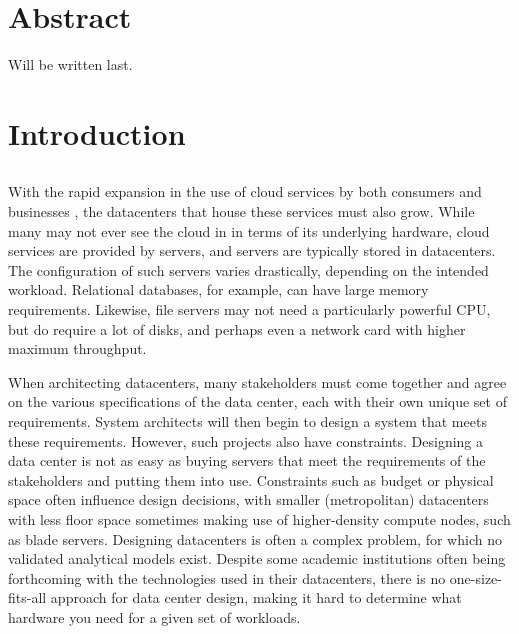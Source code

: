 \documentclass[11pt]{article}
\begin{document}
\newpage

\tableofcontents
\newpage
\listoffigures
\listoftables
\newpage


\section*{Abstract}
Will be written last.
\newpage

\section{Introduction} \label{sec:introduction}
	
	\subsection{\opendc{}}
		With the rapid expansion in the use of cloud services by both consumers and businesses \cite{Kushida2015}\cite{mokhtar2013}, the datacenters that house these services must also grow. 
		While many may not ever see the cloud in in terms of its underlying hardware, cloud services are provided by servers, and servers are typically stored in datacenters. 
		The configuration of such servers varies drastically, depending on the intended workload. 
		Relational databases, for example, can have large memory requirements. 
		Likewise, file servers may not need a particularly powerful CPU, but do require a lot of disks, and perhaps even a network card with higher maximum throughput.

		When architecting datacenters, many stakeholders must come together and agree on the various specifications of the data center, each with their own unique set of requirements. 
		System architects will then begin to design a system that meets these requirements. 
		However, such projects also have constraints. 
		Designing a data center is not as easy as buying servers that meet the requirements of the stakeholders and putting them into use. 
		Constraints such as budget or physical space often influence design decisions, with smaller (metropolitan) datacenters with less floor space sometimes making use of higher-density compute nodes, such as blade servers. 
		Designing datacenters is often a complex problem, for which no validated analytical models exist. 
		Despite some academic institutions often being forthcoming with the technologies used in their datacenters, there is no one-size-fits-all approach for data center design, making it hard to determine what hardware you need for a given set of workloads.
		
\end{document}
